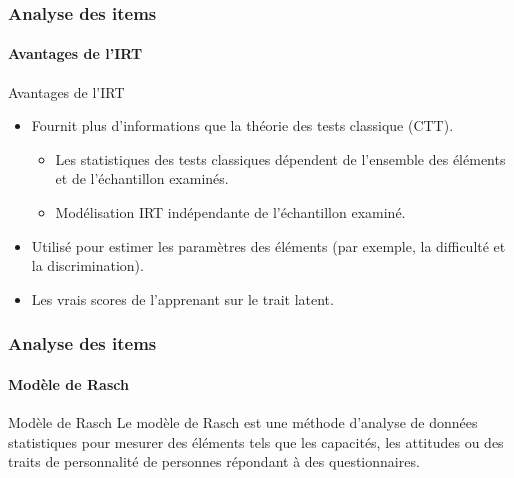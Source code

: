 \documentclass[aspectratio=169,professionalfonts, 12pt]{beamer}
\begin{document}
\begin{frame}
  \frametitle{Analyse des items}
  \framesubtitle{Avantages de l'IRT}
  \justifying 
  \begin{minipage}{\textwidth}
  \begin{block}{Avantages de l'IRT}
    \begin{itemize}
      \item	Fournit plus d'informations que la théorie des tests classique (CTT).
      \begin{itemize}
        \item Les statistiques des tests classiques dépendent de l'ensemble des éléments et de l'échantillon examinés.
        \item	Modélisation IRT indépendante de l'échantillon examiné.
      \end{itemize}
      \item Utilisé pour estimer les paramètres des éléments (par exemple, la difficulté et la discrimination).
      \item Les vrais scores de l'apprenant sur le trait latent.
    \end{itemize}
  \end{block}  
  \end{minipage} 
\end{frame}

\begin{frame}
  \frametitle{Analyse des items}
  \framesubtitle{Modèle de Rasch}
  \justifying 
  \begin{minipage}{\textwidth}
  \begin{block}{Modèle de Rasch}
    Le modèle de Rasch est une méthode d'analyse de données statistiques pour mesurer des éléments tels que les capacités, les attitudes ou des traits de personnalité de personnes répondant à des questionnaires. 
  \end{block}  
  \end{minipage} 
\end{frame}
\end{document}

